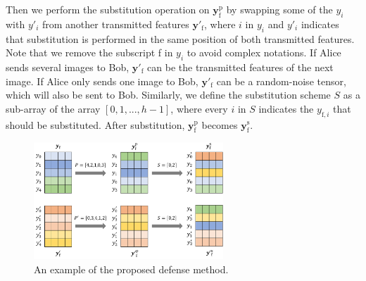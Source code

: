 \documentclass[conference]{IEEEtran}
\begin{document}
Then we perform the substitution operation on $\boldsymbol{y}^\mathrm{p}_\mathrm{f}$ by swapping some of the $y_i$ with $y'_i$ from another transmitted features $\boldsymbol{y}'_\mathrm{f}$, where $i$ in $y_i$ and $y'_i$ indicates that substitution is performed in the same position of both transmitted features. Note that we remove the subscript f in $y_i$ to avoid complex notations. If Alice sends several images to Bob, $\boldsymbol{y}'_\mathrm{f}$ can be the transmitted features of the next image. If Alice only sends one image to Bob, $\boldsymbol{y}'_\mathrm{f}$ can be a random-noise tensor, which will also be sent to Bob. Similarly, we define the substitution scheme $S$ as a sub-array of the array $[0,1,...,h-1]$, where every $i$ in $S$ indicates the $y_{\mathrm{f},i}$ that should be substituted. After substitution, $\boldsymbol{y}^\mathrm{p}_\mathrm{f}$ becomes $\boldsymbol{y}^\mathrm{s}_\mathrm{f}$. 

\begin{figure}[htbp]
\centering
   \includegraphics[width=2.8in]{figures/defense_eg.pdf}
\caption{An example of the proposed defense method.}
\label{defense eg}
\end{figure}
\end{document}
